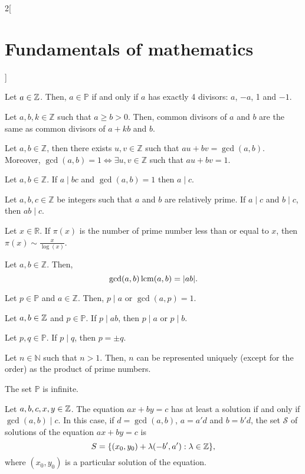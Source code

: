 \documentclass[../../../main.tex]{subfiles}
\begin{document}
\begin{multicols}{2}[\section{Fundamentals of mathematics}]
\begin{definition}
\end{definition}
\begin{prop}
    Let $a\in\mathbb{Z}$. Then, $a\in\mathbb{P}$ if and only if $a$ has exactly 4 divisors: $a$, $-a$, 1 and $-1$.
\end{prop}
\begin{lemma}
    Let $a,b,k\in\mathbb{Z}$ such that $a\geq b>0$. Then, common divisors of $a$ and $b$ are the same as common divisors of $a+kb$ and $b$.
\end{lemma}
\begin{theorem}
    Let $a,b\in\mathbb{Z}$, then there exists $u,v\in\mathbb{Z}$ such that $au+bv=\gcd(a,b)$. Moreover, $\gcd(a,b)=1\iff\exists u,v\in\mathbb{Z}$ such that $au+bv=1$.
\end{theorem}
\begin{theorem}
    Let $a,b\in\mathbb{Z}$. If $a\mid bc$ and $\gcd(a,b)=1$ then $a\mid c$.
\end{theorem}
\begin{corollary}
    Let $a,b,c\in\mathbb{Z}$ be integers such that $a$ and $b$ are relatively prime. If $a\mid c$ and $b\mid c$, then $ab\mid c$.
\end{corollary}
\begin{theorem}
    Let $x\in\mathbb{R}$. If $\pi(x)$ is the number of prime number less than or equal to $x$, then $\pi(x)\sim\frac{x}{\log(x)}$.
\end{theorem}
\begin{theorem}
    Let $a,b\in\mathbb{Z}$. Then, $$\gcd(a,b)\operatorname{lcm}(a,b)=|ab|.$$
\end{theorem}
\begin{lemma}
    Let $p\in\mathbb{P}$ and $a\in\mathbb{Z}$. Then, $p\mid a$ or $\gcd(a,p)=1$.
\end{lemma}
\begin{corollary}
    Let $a,b\in\mathbb{Z}$ and $p\in\mathbb{P}$. If $p\mid ab$, then $p\mid a$ or $p\mid b$.
\end{corollary}
\begin{corollary}
    Let $p,q\in\mathbb{P}$. If $p\mid q$, then $p=\pm q$.
\end{corollary}
\begin{theorem}
    Let $n\in\mathbb{N}$ such that $n>1$. Then, $n$ can be represented uniquely (except for the order) as the product of prime numbers.
\end{theorem}
\begin{theorem}
    The set $\mathbb{P}$ is infinite. 
\end{theorem}
\begin{theorem}
    Let $a,b,c,x,y\in\mathbb{Z}$. The equation $ax+by=c$ has at least a solution if and only if $\gcd(a,b)\mid c$. In this case, if $d=\gcd(a,b)$, $a=a'd$ and $b=b'd$, the set $\mathcal{S}$ of solutions of the equation $ax+by=c$ is $$S=\{(x_0,y_0)+\lambda(-b',a'):\lambda\in\mathbb{Z}\},$$ where $(x_0,y_0)$ is a particular solution of the equation. 
\end{theorem}

\end{multicols}
\end{document}
